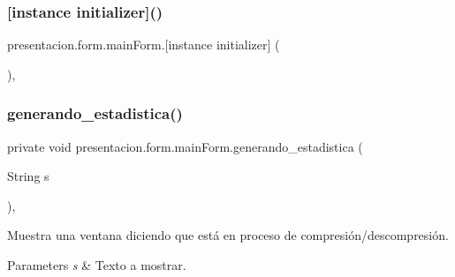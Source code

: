 \subsubsection{\texorpdfstring{[instance initializer]()}{[instance initializer]()}}
{\footnotesize\ttfamily presentacion.\+form.\+main\+Form.\mbox{[}instance initializer\mbox{]} (\begin{DoxyParamCaption}{ }\end{DoxyParamCaption})\hspace{0.3cm}{\ttfamily [inline]}, {\ttfamily [package]}}

\mbox{\label{classpresentacion_1_1form_1_1mainForm_a34580a4b6e2c162d35ab5502f0ac7e4c}} 
\subsubsection{\texorpdfstring{generando\+\_\+estadistica()}{generando\_estadistica()}}
{\footnotesize\ttfamily private void presentacion.\+form.\+main\+Form.\+generando\+\_\+estadistica (\begin{DoxyParamCaption}\item[{String}]{s }\end{DoxyParamCaption})\hspace{0.3cm}{\ttfamily [inline]}, {\ttfamily [private]}}



Muestra una ventana diciendo que está en proceso de compresión/descompresión. 


\begin{DoxyParams}{Parameters}
{\em s} & Texto a mostrar. \\
\hline
\end{DoxyParams}

